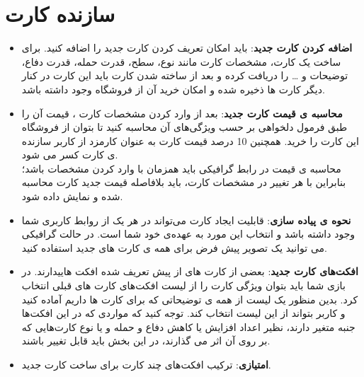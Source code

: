 \documentclass[]{article}
\begin{document}
\section*{{\titr سازنده کارت}}

\begin{itemize}
    \item \textbf{اضافه کردن کارت جدید}: باید امکان تعریف کردن کارت جدید را اضافه کنید. برای ساخت یک کارت، مشخصات کارت مانند نوع، سطح، قدرت حمله، قدرت دفاع، توضیحات و … را دریافت کرده و بعد از ساخته شدن کارت باید این کارت در کنار دیگر کارت ها ذخیره شده و امکان خرید آن از فروشگاه وجود داشته باشد.
    \item \textbf{محاسبه ی قیمت کارت جدید}: بعد از وارد کردن مشخصات کارت ، قیمت آن را طبق فرمول دلخواهی بر حسب ویژگی‌های آن محاسبه کنید تا بتوان از فروشگاه این کارت را خرید. همچنین 10 درصد قیمت کارت به عنوان کارمزد از کاربر سازنده ی کارت کسر می شود. \\
    محاسبه ی قیمت در رابط گرافیکی باید همزمان با وارد کردن مشخصات باشد؛ بنابراین با هر تغییر در مشخصات کارت، باید بلافاصله قیمت جدید کارت محاسبه شده و نمایش داده شود.
    \item \textbf{نحوه ی پیاده سازی}: قابلیت ایجاد کارت می‌تواند در هر یک از روابط کاربری شما وجود داشته باشد و انتخاب این مورد به عهده‌ی خود شما است. در حالت گرافیکی می توانید یک تصویر پیش فرض برای همه ی کارت های جدید استفاده کنید. 
    \item \textbf{افکت‌های کارت جدید}: 
    بعضی از کارت های از پیش تعریف شده افکت ‌هاییدارند. در بازی شما باید بتوان ویژگی کارت را از لیست افکت‌های کارت های قبلی انتخاب کرد. بدین منظور یک لیست از همه ی توضیحاتی که برای کارت ها داریم آماده کنید و کاربر بتواند از این لیست انتخاب کند. توجه کنید که مواردی که در این افکت‌ها جنبه متغیر دارند، نظیر اعداد افزایش یا کاهش دفاع و حمله و یا نوع کارت‌هایی که بر روی آن اثر می گذارند، در این بخش باید قابل تغییر باشند.
    
    \item \textbf{امتیازی}: ترکیب افکت‌های چند کارت برای ساخت کارت جدید.

\end{itemize}
\end{document}
